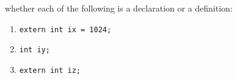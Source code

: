 %
%
\begin{question}
whether each of the following is a declaration or a
definition:
\begin{enumerate}[label=(\alph*)]
^^I\item \verb|extern int ix = 1024;|
^^I\item \verb|int iy;|
^^I\item \verb|extern int iz;|
\end{enumerate}
\end{question}
